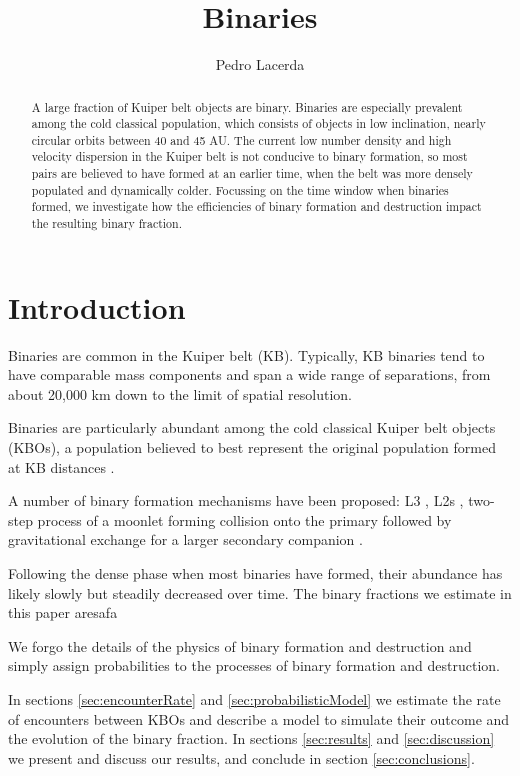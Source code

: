 \documentclass[a4paper,12pt]{article}
\begin{document}
\title{Binaries}
\author{Pedro Lacerda}

\maketitle

\begin{abstract}
A large fraction of Kuiper belt objects are binary. Binaries are especially prevalent among the cold classical population, which consists of objects in low inclination, nearly circular orbits between 40 and 45 AU.  The current low number density and high velocity dispersion in the Kuiper belt is not conducive to binary formation, so most pairs are believed to have formed at an earlier time, when the belt was more densely populated and dynamically colder.  Focussing on the time window when binaries formed, we investigate how the efficiencies of binary formation and destruction impact the resulting binary fraction.
\end{abstract}

\section{Introduction}

Binaries are common in the Kuiper belt (KB). Typically, KB binaries tend to have comparable mass components and span a wide range of separations, from about 20,000 km down to the limit of spatial resolution.

Binaries are particularly abundant among the cold classical Kuiper belt objects (KBOs), a population believed to best represent the original population formed at KB distances \cite{2010ApJ...722L.204Parker,2018Icar..306..319Gomes}.

A number of binary formation mechanisms have been proposed: L3 \cite{2002Natur.420..643G}, L2s \cite{2002Natur.420..643G}, two-step process of a moonlet forming collision onto the primary followed by gravitational exchange for a larger secondary companion \cite{2004Natur.427..518F}.

Following the dense phase when most binaries have formed, their abundance has likely slowly but steadily decreased over time.  The binary fractions we estimate in this paper aresafa

We forgo the details of the physics of binary formation and destruction and simply assign probabilities to the processes of binary formation and destruction.

In sections \ref{sec:encounterRate} and \ref{sec:probabilisticModel} we estimate the rate of encounters between KBOs and describe a model to simulate their outcome and the evolution of the binary fraction. In sections \ref{sec:results} and \ref{sec:discussion} we present and discuss our results, and conclude in section \ref{sec:conclusions}.
\end{document}

